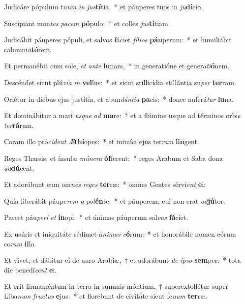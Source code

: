 \item Judicáre pópulum tu\textit{um} \textit{in} \textit{jus}\textbf{tí}tia,~* et páuperes tuos in \textit{ju}\textbf{dí}cio.
\item Suscípiant mon\textit{tes} \textit{pa}\textit{cem} \textbf{pó}pulo:~* et colles \textit{jus}\textbf{tí}tiam.
\item Judicábit páuperes pópuli, et salvos fáciet \textit{fí}\textit{li}\textit{os} \textbf{páu}perum:~* et humiliábit calumni\textit{a}\textbf{tó}rem.
\item Et permanébit cum sole, \textit{et} \textit{an}\textit{te} \textbf{lu}nam,~* in generatióne et genera\textit{ti}\textbf{ó}nem.
\item Descéndet sicut plú\textit{vi}\textit{a} \textit{in} \textbf{vel}lus:~* et sicut stillicídia stillántia su\textit{per} \textbf{ter}ram.
\item Oriétur in diébus ejus justítia, et abun\textit{dán}\textit{ti}\textit{a} \textbf{pa}cis:~* donec auferá\textit{tur} \textbf{lu}na.
\item Et dominábitur a mari \textit{us}\textit{que} \textit{ad} \textbf{ma}re:~* et a flúmine usque ad términos orbis \textit{ter}\textbf{rá}rum.
\item Coram illo pró\textit{ci}\textit{dent} \textit{Æ}\textbf{thí}opes:~* et inimíci ejus ter\textit{ram} \textbf{lin}gent.
\item Reges Tharsis, et ínsulæ \textit{mú}\textit{ne}\textit{ra} \textbf{óf}ferent:~* reges Arabum et Saba dona \textit{ad}\textbf{dú}cent.
\item Et adorábunt eum om\textit{nes} \textit{re}\textit{ges} \textbf{ter}ræ:~* omnes Gentes sérvi\textit{ent} \textbf{e}i:
\item Quia liberábit páupe\textit{rem} \textit{a} \textit{pot}\textbf{én}te:~* et páuperem, cui non erat \textit{ad}\textbf{jú}tor.
\item Parcet páu\textit{pe}\textit{ri} \textit{et} \textbf{ín}opi:~* et ánimas páuperum sal\textit{vas} \textbf{fá}ciet.
\item Ex usúris et iniquitáte rédimet á\textit{ni}\textit{mas} \textit{e}\textbf{ó}rum:~* et honorábile nomen eórum co\textit{ram} \textbf{il}lo.
\item Et vivet, et dábitur ei de auro Arábiæ,~† et adorábunt \textit{de} \textit{ip}\textit{so} \textbf{sem}per:~* tota die benedí\textit{cent} \textbf{e}i.
\item Et erit firmaméntum in terra in summis móntium,~† superextollétur super Líba\textit{num} \textit{fruc}\textit{tus} \textbf{e}jus:~* et florébunt de civitáte sicut fe\textit{num} \textbf{ter}ræ.
